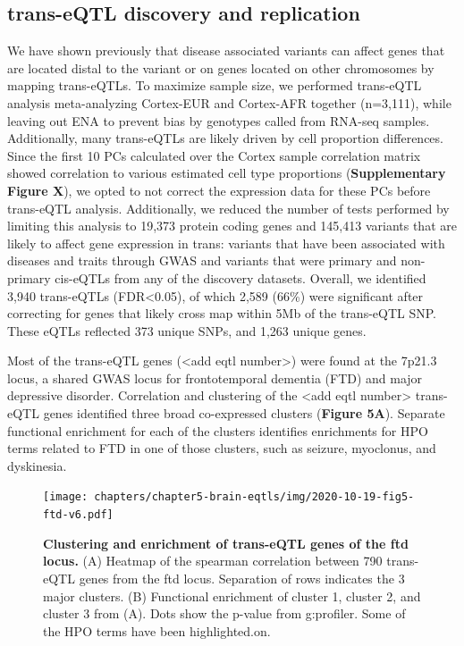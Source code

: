 {{\subsection{trans-eQTL discovery and replication}
We have shown previously that disease associated variants can affect genes that are located distal to the variant or on genes located on other chromosomes by mapping trans-eQTLs. To maximize sample size, we performed trans-eQTL analysis meta-analyzing Cortex-EUR and Cortex-AFR together (n=3,111), while leaving out ENA to prevent bias by genotypes called from RNA-seq samples. Additionally, many trans-eQTLs are likely driven by cell proportion differences. Since the first 10 PCs calculated over the Cortex sample correlation matrix showed correlation to various estimated cell type proportions (\textbf{Supplementary Figure X}), we opted to not correct the expression data for these PCs before trans-eQTL analysis. Additionally, we reduced the number of tests performed by limiting this analysis to 19,373 protein coding genes and 145,413 variants that are likely to affect gene expression in trans: variants that have been associated with diseases and traits through GWAS and variants that were primary and non-primary cis-eQTLs from any of the discovery datasets. Overall, we identified 3,940 trans-eQTLs (FDR<0.05), of which 2,589 (66\%) were significant after correcting for genes that likely cross map within 5Mb of the trans-eQTL SNP. These eQTLs reflected 373 unique SNPs, and 1,263 unique genes.  

Most of the trans-eQTL genes (<add eqtl number>) were found at the 7p21.3 locus, a shared GWAS locus for frontotemporal dementia (FTD) and major depressive disorder. Correlation and clustering of the <add eqtl number> trans-eQTL genes identified three broad co-expressed clusters (\textbf{Figure 5A}). Separate functional enrichment for each of the clusters identifies enrichments for HPO terms related to FTD in one of those clusters, such as seizure, myoclonus, and dyskinesia.  

\begin{figure}[H]
	\texttt{[image: chapters/chapter5-brain-eqtls/img/2020-10-19-fig5-ftd-v6.pdf]}
	\caption{\textbf{Clustering and enrichment of trans-eQTL genes of the ftd locus.} (A) Heatmap of the spearman correlation between 790 trans-eQTL genes from the ftd locus. Separation of rows indicates the 3 major clusters. (B) Functional enrichment of cluster 1, cluster 2, and cluster 3 from (A). Dots show the p-value from g:profiler. Some of the HPO terms have been highlighted.on.}
\end{figure}


}}
